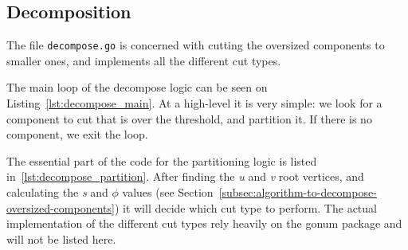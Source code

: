 \subsection{Decomposition}

The file \texttt{decompose.go} is concerned with cutting the oversized components to smaller ones, and implements all the different cut types.

The main loop of the decompose logic can be seen on Listing~\ref{lst:decompose_main}. At a high-level it is very simple: we look for a component to cut that is over the threshold, and partition it. If there is no component, we exit the loop.



The essential part of the code for the partitioning logic is listed in~\ref{lst:decompose_partition}. After finding the \textit{u} and \textit{v} root vertices, and calculating the \textit{s} and \(\phi \) values (see Section~\ref{subsec:algorithm-to-decompose-oversized-components}) it will decide which cut type to perform. The actual implementation of the different cut types rely heavily on the gonum package and will not be listed here.

